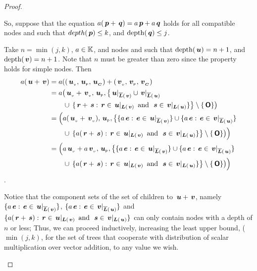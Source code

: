 \begin{proposition}
\begin{proof}
\begin{description}
      So, suppose that the equation \(a ( \node{p} + \node{q}) =
      a \node{p} + a \node{q}\) holds for all compatible nodes  and
       such that \(depth(\node{p}) \leq k\), and
      \(\depth(\node{q}) \leq j\).

      Take \(n = \min(j, k)\), \(a\in\FIELD\), and nodes  and  such that
      \(\depth(\node{u}) = n+1\), and \(\depth(\node{v}) = n+1\).
      Note that \(n\) must be greater than zero since the property holds for simple
      nodes.  Then
      \begin{align*}
        a(\node{u} + \node{v}) &= a (\Node{\nv{u}}{\nlabel{u}}{\child{u}} + \Node{\nv{v}}{\nlabel{v}}{\child{v}}\\ 
        &= a \bigl(\nv{u} + \nv{v}, \nlabel{u}, \bigl\{\nrestrictedto{u}{v} \cup \nrestrictedto{v}{u} \\
        &\qquad \cup \hspace{2pt} \{\node{r} + \node{s}:  \node{r} \in \restrictedto{u}{v}\mand \node{s} \in \restrictedto{v}{u} \} \bigr\} \setminus \{\zerotree\} \bigr) \\
        &= \Bigl(a (\nv{u} + \nv{v}), \nlabel{u}, 
        \bigl\{\{a \node{e}: \node{e} \in \nrestrictedto{u}{v}\} \cup \{a \node{e}: \node{e} \in \nrestrictedto{v}{u}\} \\
        &\qquad \cup \hspace{2pt} \{a (\node{r} + \node{s}):  \node{r} \in \restrictedto{u}{v}\mand \node{s} \in \restrictedto{v}{u} \} \bigr\} \setminus \{\zerotree\} \bigr)\Bigr) \\
        &= \Bigl(a \nv{u} + a \nv{v}, \nlabel{u},  
        \bigl\{\{a \node{e}: \node{e} \in \nrestrictedto{u}{v}\} \cup \{a \node{e}: \node{e} \in \nrestrictedto{v}{u}\} \\
        &\qquad \cup \hspace{2pt} \{a (\node{r} + \node{s}):  \node{r} \in \restrictedto{u}{v}\mand \node{s} \in \restrictedto{v}{u} \} \bigr\} \setminus \{\zerotree\} \bigr)\Bigr)
      \end{align*}.

      Notice that the component sets of the set of children to \(\node{u} +
      \node{v}\), namely \(\{a \node{e}: \node{e} \in
      \nrestrictedto{u}{v}\}\),  
      \(\{a \node{e}: \node{e} \in
      \nrestrictedto{v}{u}\}\) and \(\{a (\node{r} + \node{s}):
      \node{r} \in \restrictedto{u}{v}\mand \node{s} \in
      \restrictedto{v}{u} \}\) can only contain nodes with a depth of
      \(n\) or less; Thus, we can proceed inductively, increasing
      the least upper bound, (\(\min(j, k)\), for the set of trees
      that cooperate with distribution of scalar multiplication over
      vector addition, to any value we wish.


\end{description}
\end{proof}
\end{proposition}
